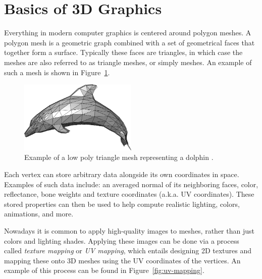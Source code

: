 \section{Basics of 3D Graphics}

Everything in modern computer graphics is centered around polygon meshes.
A polygon mesh is a geometric graph combined with a set of geometrical faces that together form a surface.
Typically these faces are triangles, in which case the meshes are also referred to as triangle meshes, or simply meshes.
An example of such a mesh is shown in Figure~\ref{fig:low_poly_dolphin}.

\begin{figure}[h!]
  \centering

  \includegraphics[width=0.5\textwidth]{figure/low_poly_dolphin.png}
  \caption{Example of a low poly triangle mesh representing a dolphin \cite{low_poly_dolphin}.}

  \label{fig:low_poly_dolphin}
\end{figure}

Each vertex can store arbitrary data alongside its own coordinates in space.
Examples of such data include: an averaged normal of its neighboring faces, color, reflectance, bone weights and texture coordinates (a.k.a. UV coordinates).
These stored properties can then be used to help compute realistic lighting, colors, animations, and more.

Nowadays it is common to apply high-quality images to meshes, rather than just colors and lighting shades.
Applying these images can be done via a process called \textit{texture mapping} or \textit{UV mapping}, which entails designing 2D textures and mapping these onto 3D meshes using the UV coordinates of the vertices.
An example of this process can be found in Figure~\ref{fig:uv-mapping}.

